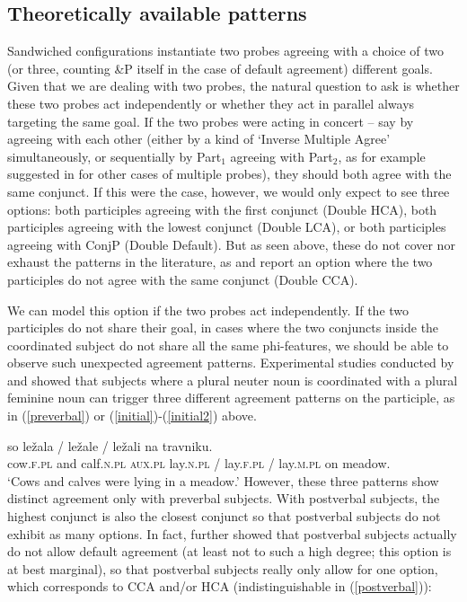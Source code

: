 \documentclass[output=paper
,modfonts
,nonflat]{langsci/langscibook}
\begin{document}
\subsection{Theoretically available patterns}

Sandwiched configurations instantiate two probes agreeing with a choice of two (or three, counting \&P itself in the case of default agreement) different goals. Given that we are dealing with two probes, the natural question to ask is whether these two probes act independently or whether they act in parallel always targeting the same goal. If the two probes were acting in concert -- say by agreeing with each other (either by a kind of `Inverse Multiple Agree' simultaneously, or sequentially by Part$_1$ agreeing with Part$_2$, as for example suggested in \citet{puskarmurphy:17} for other cases of multiple probes), they should both agree with the same conjunct. If this were the case, however, we would only expect to see three options: both participles agreeing with the first conjunct (Double HCA), both participles agreeing with the lowest conjunct (Double LCA), or both participles agreeing with ConjP (Double Default). But as seen above, these do not cover nor exhaust the patterns in the literature, as \cite{marusicnevinssaksida:07} and \cite{marusicnevinsbadecker:15} report an option where the two participles do not agree with the same conjunct (Double CCA).

We can model this option if the two probes act independently. If the two participles do not share their goal, in cases where the two conjuncts inside the coordinated subject do not share all the same phi-features, we should be able to observe such unexpected agreement patterns. Experimental studies conducted by \cite{marusicnevinsbadecker:15} and \cite{willergold:16} showed that subjects where a plural neuter noun is coordinated with a plural feminine noun can trigger three different agreement patterns on the participle, as in (\ref{preverbal}) or (\ref{initial})-(\ref{initial2}) above.

\ea \label{preverbal}
 so ležala / ležale  / ležali na travniku.\\
{} cow.\textsc{f.pl} and calf.\textsc{n.pl} {} \textsc{aux.pl} lay.\textsc{n.pl} / lay.\textsc{f.pl} / lay.\textsc{m.pl} on meadow.\\
\glt `Cows and calves were lying in a meadow.'
\z
However, these three patterns show distinct agreement only with preverbal subjects. With postverbal subjects, the highest conjunct is also the closest conjunct so that postverbal subjects do not exhibit as many options. In fact, \cite{willergold:16} further showed that postverbal subjects actually do not allow default agreement (at least not to such a high degree; this option is at best marginal), so that postverbal subjects really only allow for one option, which corresponds to CCA and/or HCA (indistinguishable in (\ref{postverbal})):
\end{document}
